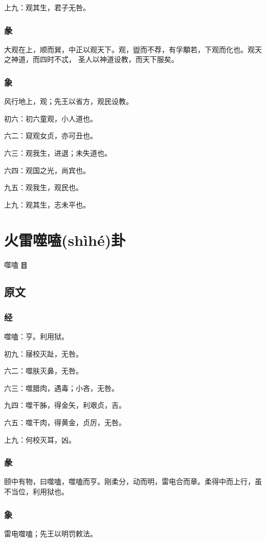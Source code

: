 \documentclass[12pt,oneside]{book}
\begin{document}
上九：观其生，君子无咎。

\subsection{彖}
大观在上，顺而巽，中正以观天下。观，盥而不荐，有孚顒若，下观而化也。观天之神道，而四时不忒， 圣人以神道设教，而天下服矣。

\subsection{象}
风行地上，观；先王以省方，观民设教。

初六：初六童观，小人道也。

六二：窥观女贞，亦可丑也。

六三：观我生，进退；未失道也。

六四：观国之光，尚宾也。

九五：观我生，观民也。

上九：观其生，志未平也。


\chapter{火雷噬嗑(shìhé)卦}
噬嗑 {\Large ䷔}

\section{原文}

\subsection{经}
噬嗑：亨。利用狱。

初九：屦校灭趾，无咎。

六二：噬肤灭鼻，无咎。

六三：噬腊肉，遇毒；小吝，无咎。

九四：噬干胏，得金矢，利艰贞，吉。

六五：噬干肉，得黄金，贞厉，无咎。

上九：何校灭耳，凶。

\subsection{彖}
颐中有物，曰噬嗑，噬嗑而亨。刚柔分，动而明，雷电合而章。柔得中而上行，虽不当位，利用狱也。

\subsection{象}
雷电噬嗑；先王以明罚敕法。
\end{document}
